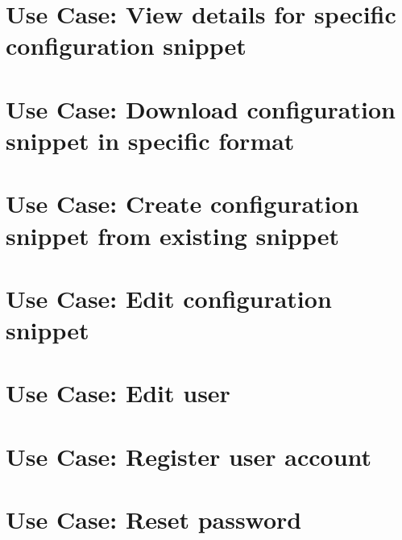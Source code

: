 \documentclass[twoside]{book}
\newcommand{\+}{\discretionary{\mbox{\scriptsize$\hookleftarrow$}}{}{}}
\begin{document}
\chapter{Use Case\+: View details for specific configuration snippet}
\label{doc_usecases_snippet_sharing_UC_details_snippet_md}

\chapter{Use Case\+: Download configuration snippet in specific format}
\label{doc_usecases_snippet_sharing_UC_download_snippet_md}

\chapter{Use Case\+: Create configuration snippet from existing snippet}
\label{doc_usecases_snippet_sharing_UC_duplicate_snippet_md}

\chapter{Use Case\+: Edit configuration snippet}
\label{doc_usecases_snippet_sharing_UC_edit_snippet_md}

\chapter{Use Case\+: Edit user}
\label{doc_usecases_snippet_sharing_UC_edit_user_md}

\chapter{Use Case\+: Register user account}
\label{doc_usecases_snippet_sharing_UC_register_md}

\chapter{Use Case\+: Reset password}
\label{doc_usecases_snippet_sharing_UC_reset_password_md}

\end{document}
